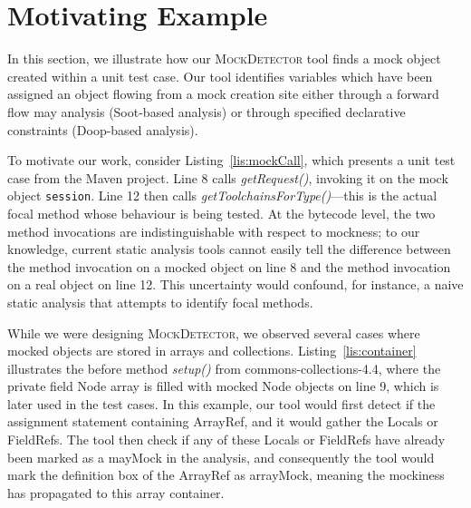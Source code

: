 \section{Motivating Example}
\label{sec:motivating-example}

In this section, we illustrate how our \textsc{MockDetector} tool finds a mock object created within a unit test case. Our tool identifies variables which have been assigned an object flowing from a mock creation site either through a forward flow may analysis (Soot-based analysis) or through specified declarative constraints (Doop-based analysis).


To motivate our work, consider Listing~\ref{lis:mockCall}, which presents a unit test case from the Maven project. Line 8 calls \textit{getRequest()}, invoking it on the mock object \texttt{session}. Line 12 then calls \textit{getToolchainsForType()}---this is the actual focal method whose behaviour is being tested. At the bytecode level, the two method invocations are indistinguishable with respect to mockness; to our knowledge, current static analysis tools cannot easily tell the difference between the method invocation on a mocked object on line 8 and the method invocation on a real object on line 12. This uncertainty would confound, for instance, a naive static analysis that attempts to identify focal methods.

While we were designing \textsc{MockDetector}, we observed several cases where mocked objects are stored in arrays and collections. Listing~\ref{lis:container} illustrates the before method \textit{setup()} from commons-collections-4.4, where the private field Node array is filled with mocked Node objects on line 9, which is later used in the test cases. In this example, our tool would first detect if the assignment statement containing ArrayRef, and it would gather the Locals or FieldRefs. The tool then check if any of these Locals or FieldRefs have already been marked as a mayMock in the analysis, and consequently the tool would mark the definition box of the ArrayRef as arrayMock, meaning the mockiness has propagated to this array container. 


